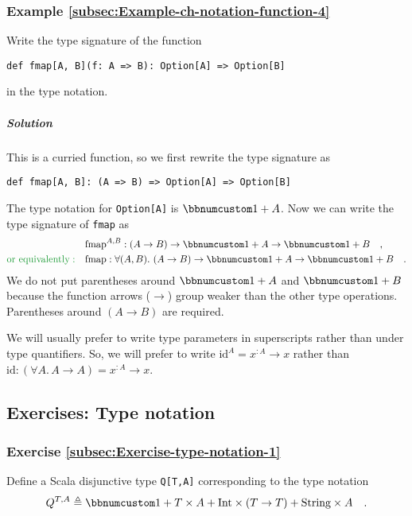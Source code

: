 \subsubsection{Example \label{subsec:Example-ch-notation-function-4}\ref{subsec:Example-ch-notation-function-4}}

Write the type signature of the function
\begin{lstlisting}
def fmap[A, B](f: A => B): Option[A] => Option[B]
\end{lstlisting}
in the type notation.

\subparagraph{Solution}

This is a curried function, so we first rewrite the type signature
as
\begin{lstlisting}
def fmap[A, B]: (A => B) => Option[A] => Option[B]
\end{lstlisting}
The type notation for \lstinline!Option[A]! is $\bbnum 1+A$. Now
we can write the type signature of \lstinline!fmap! as
\begin{align*}
 & \text{fmap}^{A,B}:\left(A\rightarrow B\right)\rightarrow\bbnum 1+A\rightarrow\bbnum 1+B\quad,\\
{\color{greenunder}\text{or equivalently}:}\quad & \text{fmap}:\forall(A,B).\,\left(A\rightarrow B\right)\rightarrow\bbnum 1+A\rightarrow\bbnum 1+B\quad.
\end{align*}
We do not put parentheses around $\bbnum 1+A$ and $\bbnum 1+B$ because
the function arrows ($\rightarrow$) group weaker than the other type
operations. Parentheses around $\left(A\rightarrow B\right)$ are
required.

We will usually prefer to write type parameters in superscripts rather
than under type quantifiers. So, we will prefer to write $\text{id}^{A}=x^{:A}\rightarrow x$
rather than $\text{id}:(\forall A.\,A\rightarrow A)=x^{:A}\rightarrow x$.

\subsection{Exercises: Type notation}

\subsubsection{Exercise \label{subsec:Exercise-type-notation-1}\ref{subsec:Exercise-type-notation-1}}

Define a Scala disjunctive type \lstinline!Q[T,A]! corresponding
to the type notation
\[
Q^{T,A}\triangleq\bbnum 1+T\times A+\text{Int}\times(T\rightarrow T)+\text{String}\times A\quad.
\]


